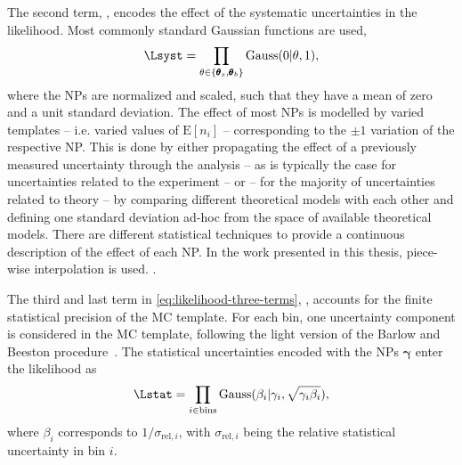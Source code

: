 The second term, \Lsyst, encodes the effect of the systematic uncertainties in the likelihood. Most commonly standard Gaussian functions are used,
\begin{equation}
    \Lsyst = \prod_{\theta \in \{ \pmb{\theta}_s,\pmb{\theta}_b \}} \text{Gauss}(0 | \theta, 1),
\end{equation}
where the NPs are normalized and scaled, such that they have a mean of zero and a unit standard deviation.
The effect of most NPs is modelled by varied templates -- i.e. varied values of $\text{E}[n_i]$ -- corresponding to the $\pm 1$ variation of the respective NP. This is done by either propagating the effect of a previously measured uncertainty through the analysis -- as is typically the case for uncertainties related to the experiment -- or -- for the majority of uncertainties related to theory -- by comparing different theoretical models with each other and defining one standard deviation ad-hoc from the space of available theoretical models.
There are different statistical techniques to provide a continuous description of the effect of each NP.
In the work presented in this thesis, piece-wise interpolation is used. .

The third and last term in \cref{eq:likelihood-three-terms}, \Lstat, accounts for the finite statistical precision of the MC template. For each bin, one uncertainty component is considered in the MC template, following the light version of the Barlow and Beeston procedure~\cite{BARLOW1993219}. 
The statistical uncertainties encoded with the NPs $\pmb{\gamma}$ enter the likelihood as
\begin{equation}
    \Lstat = \prod_{i \in \text{bins}} \text{Gauss}(\beta_i | \gamma_i, \sqrt{\gamma_i \beta_i}),    
\end{equation}
where $\beta_i$ corresponds to $1 / \sigma_{\text{rel}, i}$, with $\sigma_{\text{rel}, i}$ being the relative statistical uncertainty in bin $i$. 


